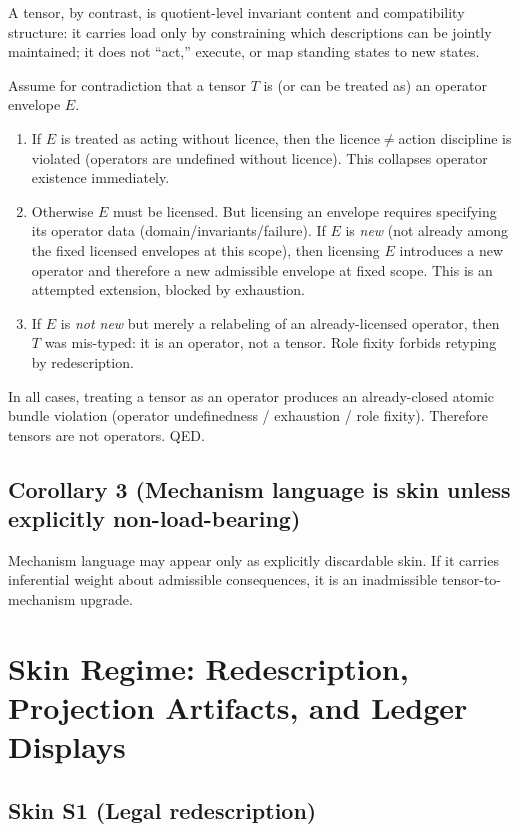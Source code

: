 \documentclass[12pt]{article}
\theoremstyle{plain}
\begin{document}
A tensor, by contrast, is quotient-level invariant content and compatibility structure: it carries load only by constraining which descriptions can be jointly maintained; it does not ``act,'' execute, or map standing states to new states.

Assume for contradiction that a tensor $T$ is (or can be treated as) an operator envelope $E$.

\begin{enumerate}[leftmargin=*]
\item If $E$ is treated as acting without licence, then the licence$\neq$action discipline is violated (operators are undefined without licence). This collapses operator existence immediately.

\item Otherwise $E$ must be licensed. But licensing an envelope requires specifying its operator data (domain/invariants/failure). If $E$ is \emph{new} (not already among the fixed licensed envelopes at this scope), then licensing $E$ introduces a new operator and therefore a new admissible envelope at fixed scope. This is an attempted extension, blocked by exhaustion.

\item If $E$ is \emph{not new} but merely a relabeling of an already-licensed operator, then $T$ was mis-typed: it is an operator, not a tensor. Role fixity forbids retyping by redescription.
\end{enumerate}

In all cases, treating a tensor as an operator produces an already-closed atomic bundle violation (operator undefinedness / exhaustion / role fixity). Therefore tensors are not operators. QED.


\subsection{Corollary 3 (Mechanism language is skin unless explicitly non-load-bearing)}

Mechanism language may appear only as explicitly discardable skin. If it carries inferential weight about admissible consequences, it is an inadmissible tensor-to-mechanism upgrade.

\section{Skin Regime: Redescription, Projection Artifacts, and Ledger Displays}

\subsection{Skin S1 (Legal redescription)}
\end{document}
